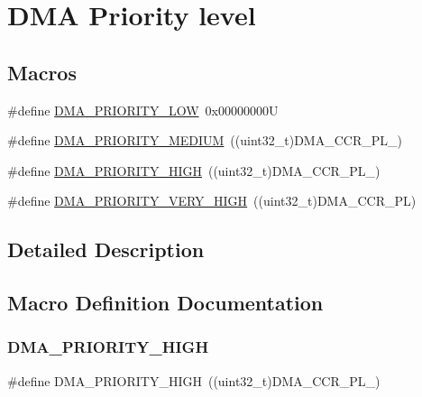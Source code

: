 \hypertarget{group___d_m_a___priority__level}{}\section{D\+MA Priority level}
\label{group___d_m_a___priority__level}
\subsection*{Macros}
\begin{DoxyCompactItemize}
\item 
\#define \hyperlink{group___d_m_a___priority__level_ga0d1ed2bc9229ba3c953002bcf3a72130}{D\+M\+A\+\_\+\+P\+R\+I\+O\+R\+I\+T\+Y\+\_\+\+L\+OW}~0x00000000U
\item 
\#define \hyperlink{group___d_m_a___priority__level_gad6fbeee76fd4a02cbed64365bb4c1781}{D\+M\+A\+\_\+\+P\+R\+I\+O\+R\+I\+T\+Y\+\_\+\+M\+E\+D\+I\+UM}~((uint32\+\_\+t)D\+M\+A\+\_\+\+C\+C\+R\+\_\+\+P\+L\+\_)
\item 
\#define \hyperlink{group___d_m_a___priority__level_ga6b2f5c5e22895f8b4bd52a27ec6cae2a}{D\+M\+A\+\_\+\+P\+R\+I\+O\+R\+I\+T\+Y\+\_\+\+H\+I\+GH}~((uint32\+\_\+t)D\+M\+A\+\_\+\+C\+C\+R\+\_\+\+P\+L\+\_)
\item 
\#define \hyperlink{group___d_m_a___priority__level_gaed0542331a4d875d1d8d5b2878e9372c}{D\+M\+A\+\_\+\+P\+R\+I\+O\+R\+I\+T\+Y\+\_\+\+V\+E\+R\+Y\+\_\+\+H\+I\+GH}~((uint32\+\_\+t)D\+M\+A\+\_\+\+C\+C\+R\+\_\+\+PL)
\end{DoxyCompactItemize}


\subsection{Detailed Description}


\subsection{Macro Definition Documentation}
\mbox{\label{group___d_m_a___priority__level_ga6b2f5c5e22895f8b4bd52a27ec6cae2a}} 
\subsubsection{\texorpdfstring{D\+M\+A\+\_\+\+P\+R\+I\+O\+R\+I\+T\+Y\+\_\+\+H\+I\+GH}{DMA\_PRIORITY\_HIGH}}
{\footnotesize\ttfamily \#define D\+M\+A\+\_\+\+P\+R\+I\+O\+R\+I\+T\+Y\+\_\+\+H\+I\+GH~((uint32\+\_\+t)D\+M\+A\+\_\+\+C\+C\+R\+\_\+\+P\+L\+\_)}

